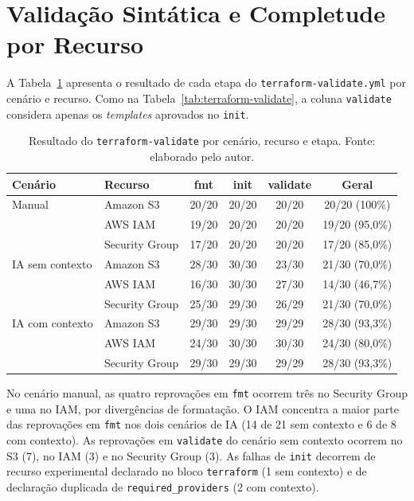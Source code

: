 \section{Validação Sintática e Completude por Recurso}
\label{apx:validacao}

A Tabela~\ref{tab:apx-validate} apresenta o resultado de cada etapa do \texttt{terraform-validate.yml} por cenário e recurso. Como na Tabela~\ref{tab:terraform-validate}, a coluna \texttt{validate} considera apenas os \textit{templates} aprovados no \texttt{init}.

\begin{table}[H]
\centering
\caption{Resultado do \texttt{terraform-validate} por cenário, recurso e etapa. Fonte: elaborado pelo autor.}
\label{tab:apx-validate}
\small
\begin{tabular}{l|l|c|c|c|c}
\hline
\textbf{Cenário} & \textbf{Recurso} & \textbf{fmt} & \textbf{init} & \textbf{validate} & \textbf{Geral} \\
\hline
Manual & Amazon S3 & 20/20 & 20/20 & 20/20 & 20/20 (100\%) \\
 & AWS IAM & 19/20 & 20/20 & 20/20 & 19/20 (95,0\%) \\
 & Security Group & 17/20 & 20/20 & 20/20 & 17/20 (85,0\%) \\
\hline
IA sem contexto & Amazon S3 & 28/30 & 30/30 & 23/30 & 21/30 (70,0\%) \\
 & AWS IAM & 16/30 & 30/30 & 27/30 & 14/30 (46,7\%) \\
 & Security Group & 25/30 & 29/30 & 26/29 & 21/30 (70,0\%) \\
\hline
IA com contexto & Amazon S3 & 29/30 & 29/30 & 29/29 & 28/30 (93,3\%) \\
 & AWS IAM & 24/30 & 30/30 & 30/30 & 24/30 (80,0\%) \\
 & Security Group & 29/30 & 29/30 & 29/29 & 28/30 (93,3\%) \\
\hline
\end{tabular}
\end{table}

No cenário manual, as quatro reprovações em \texttt{fmt} ocorrem três no Security Group e uma no IAM, por divergências de formatação. O IAM concentra a maior parte das reprovações em \texttt{fmt} nos dois cenários de IA (14 de 21 sem contexto e 6 de 8 com contexto). As reprovações em \texttt{validate} do cenário sem contexto ocorrem no S3 (7), no IAM (3) e no Security Group (3). As falhas de \texttt{init} decorrem de recurso experimental declarado no bloco \texttt{terraform} (1 sem contexto) e de declaração duplicada de \texttt{required\_providers} (2 com contexto).

